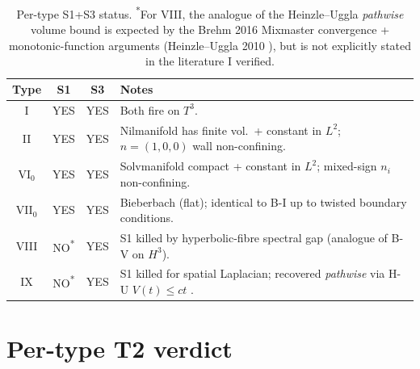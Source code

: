 \documentclass[11pt,a4paper]{article}
\theoremstyle{definition}
\begin{document}
\begin{table}[ht]
\centering
\begin{tabular}{|c|c|c|p{8cm}|}
\hline
Type   & S1 & S3 & Notes \\
\hline
I      & YES & YES & Both fire on $T^3$. \\
II     & YES & YES & Nilmanifold has finite vol.\ + constant in $L^2$;
                     $n=(1,0,0)$ wall non-confining. \\
VI$_0$ & YES & YES & Solvmanifold compact + constant in $L^2$; mixed-sign
                     $n_i$ non-confining. \\
VII$_0$ & YES & YES & Bieberbach (flat); identical to B-I up to twisted
                     boundary conditions. \\
VIII   & NO\textsuperscript{*} & YES & S1 killed by hyperbolic-fibre spectral
                     gap (analogue of B-V on $H^3$). \\
IX     & NO\textsuperscript{*} & YES & S1 killed for spatial Laplacian;
                     recovered \emph{pathwise} via H-U $V(t) \le c t$ \cite{T2BIX}. \\
\hline
\end{tabular}
\caption{Per-type S1+S3 status. \textsuperscript{*}For VIII, the analogue
of the Heinzle--Uggla \emph{pathwise} volume bound is expected by the Brehm
2016 \cite{Brehm2016} Mixmaster convergence + monotonic-function arguments
(Heinzle--Uggla 2010 \cite{HU2010}), but is not explicitly stated in the
literature I verified.}
\label{tab:s1s3}
\end{table}

\section{Per-type T2 verdict}
\end{document}
